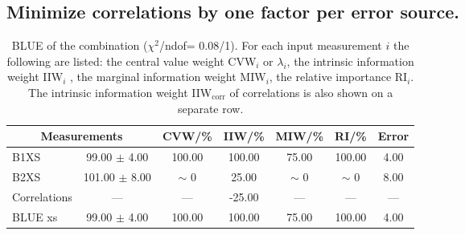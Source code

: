 \subsection{Minimize correlations by one factor per error source.}
\begin{table}[H]
\scriptsize
\begin{center}
\renewcommand{\arraystretch}{1.1}
\begin{tabular}{|lc|c|c|c|c|c|}
\hline
\multicolumn{2}{|c|}{Measurements} & CVW/\%  & IIW/\%  & MIW/\%  & RI/\%  & {\tiny Error}\\
\hline
B1XS &      99.00 $\pm$       4.00 &     100.00 &     100.00 &      75.00 &     100.00 &       4.00\\
B2XS &     101.00 $\pm$       8.00 &  {\tiny $\sim$ }0 &      25.00 &  {\tiny $\sim$ }0 &  {\tiny $\sim$ }0 &       8.00\\
Correlations & --- & --- &     -25.00 & --- & --- & ---\\
\hline
BLUE {\tiny xs} &      99.00 $\pm$       4.00 &     100.00 &     100.00 &      75.00 &     100.00 &       4.00\\
\hline
\end{tabular}
\caption{BLUE of the combination ($\chi^2$/ndof=      0.08/1).
 For each input measurement $i$ the following are listed: the central value weight CVW$_i$ or $\lambda_i$, the intrinsic information weight IIW$_i$ , the marginal information weight MIW$_i$, the relative importance RI$_i$. The intrinsic information weight IIW$_{\mathrm{corr}}$ of correlations is also shown on a separate row.}
\renewcommand{\arraystretch}{1}
\end{center}
\end{table}
